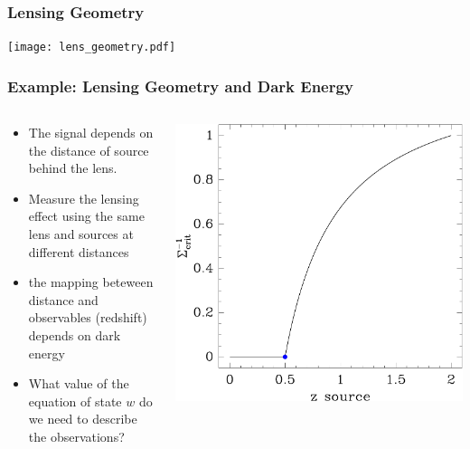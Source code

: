 \documentclass{beamer}
\begin{document}
\frame
{
    \frametitle{Lensing Geometry}

    \texttt{[image: lens\_geometry.pdf]}

}

\frame
{
    \frametitle{Example: Lensing Geometry and Dark Energy}

    \begin{columns}
        \begin{column}{0.5\textwidth}    
            \begin{itemize}

                \item The signal depends on the distance of source behind
                    the lens.


                \item Measure the lensing effect using the same lens and sources
                    at different distances

                \item the mapping beteween distance and observables (redshift) 
                    depends on dark energy

                \item What value of the equation of state $w$ do we need to
                    describe the observations?

            \end{itemize}
        \end{column}
        \begin{column}{0.5\textwidth}
            \includegraphics[width=\textwidth]{scinv-example.pdf}
        \end{column}
    \end{columns}
}
\end{document}
